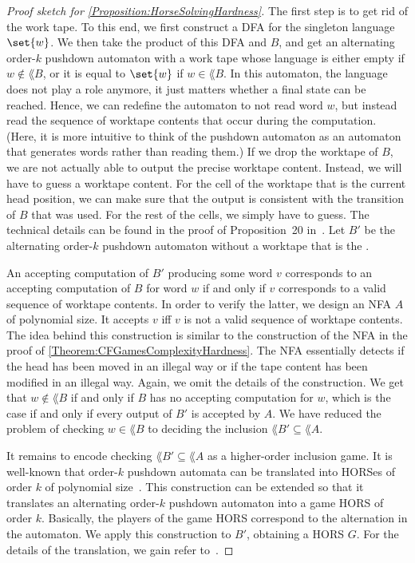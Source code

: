 \documentclass[../../diss.tex]{subfiles}
\begin{document}
\begin{proof}[Proof sketch for \cref{Proposition:HorseSolvingHardness}]
    The first step is to get rid of the work tape.
    To this end, we first construct a DFA for the singleton language $\set{w}$.
    We then take the product of this DFA and $B$, and get an alternating order-$k$ pushdown automaton with a work tape whose language is either empty if $w \not\in \lang{B}$, or it is equal to $\set{w}$ if $w \in \lang{B}$.
    In this automaton, the language does not play a role anymore, it just matters whether a final state can be reached.
    Hence, we can redefine the automaton to not read word $w$, but instead read the sequence of worktape contents that occur during the computation.
    (Here, it is more intuitive to think of the pushdown automaton as an automaton that generates words rather than reading them.)
    If we drop the worktape of $B$, we are not actually able to output the precise worktape content.
    Instead, we will have to guess a worktape content.
    For the cell of the worktape that is the current head position, we can make sure that the output is consistent with the transition of $B$ that was used.
    For the rest of the cells, we simply have to guess.
    The technical details can be found in the proof of Proposition~20 in~\cite{HagueMM17a}.
    Let $B'$ be the alternating order-$k$ pushdown automaton without a worktape that is the .

    An accepting computation of $B'$ producing some word $v$ corresponds to an accepting computation of $B$ for word $w$ if and only if $v$ corresponds to a valid sequence of worktape contents.
    In order to verify the latter, we design an NFA $A$ of polynomial size.
    It accepts $v$ iff $v$ is not a valid sequence of worktape contents.
    The idea behind this construction is similar to the construction of the NFA in the proof of \cref{Theorem:CFGamesComplexityHardness}.
    The NFA essentially detects if the head has been moved in an illegal way or if the tape content has been modified in an illegal way.
    Again, we omit the details of the construction.
    We get that $w \not\in \lang{B}$ if and only if $B$ has no accepting computation for $w$, which is the case if and only if every output of $B'$ is accepted by $A$.
    We have reduced the problem of checking $w \in \lang{B}$ to deciding the inclusion $\lang{B'} \subseteq \lang{A}$.

    It remains to encode checking $\lang{B'} \subseteq \lang{A}$ as a higher-order inclusion game.
    It is well-known that order-$k$ pushdown automata can be translated into HORSes of order $k$ of polynomial size~\cite{KnapikNU02}.
    This construction can be extended so that it translates an alternating order-$k$ pushdown automaton into a game HORS of order $k$.
    Basically, the players of the game HORS correspond to the alternation in the automaton.
    We apply this construction to $B'$, obtaining a HORS $G$.
    For the details of the translation, we gain refer to~\cite{HagueMM17a}.


\end{proof}
\end{document}
